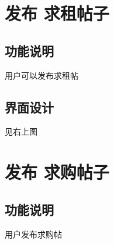 \section{发布 求租帖子}

\subsection{功能说明}
用户可以发布求租帖
\subsection{界面设计}
见右上图
\newpage
\section{发布 求购帖子}

\subsection{功能说明}
用户发布求购帖
